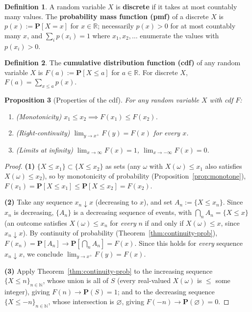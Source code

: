 \documentclass[11pt]{article}
\theoremstyle{definition}
\newtheorem{definition}{Definition}[section]
\theoremstyle{plain}
\newtheorem{proposition}[definition]{Proposition}
\theoremstyle{remark}
\newcommand{\R}{\mathbb{R}}
\newcommand{\N}{\mathbb{N}}
\begin{document}
\begin{definition}
A random variable $X$ is \textbf{discrete} if it takes at most countably many values.
The \textbf{probability mass function (pmf)} of a discrete $X$ is
$p(x) := \mathbf{P}[X=x]$ for $x \in \R$; necessarily $p(x)>0$ for at most countably many $x$, and
$\sum_{i} p(x_i) = 1$ where $x_1,x_2,\dots$ enumerate the values with $p(x_i)>0$.
\end{definition}

\begin{definition}
The \textbf{cumulative distribution function (cdf)} of any random variable $X$ is
$F(a) := \mathbf{P}[X\le a]$ for $a \in \R$. For discrete $X$, $F(a) = \sum_{x\le a}p(x)$.
\end{definition}

\begin{proposition}[Properties of the cdf]
\label{prop:cdf-properties}
For any random variable $X$ with cdf $F$:
\begin{enumerate}[label=(\arabic*)]
\item (Monotonicity) $x_1 \le x_2 \implies F(x_1)\le F(x_2)$.
\item (Right-continuity) $\lim_{y\to x^+}F(y) = F(x)$ for every $x$.
\item (Limits at infinity) $\lim_{x\to\infty}F(x)=1$, $\lim_{x\to-\infty}F(x)=0$.
\end{enumerate}
\end{proposition}
\begin{proof}
\textbf{(1)} $\{X\le x_1\}\subset \{X\le x_2\}$ as sets (any $\omega$ with $X(\omega)\le x_1$ also
satisfies $X(\omega)\le x_2$), so by monotonicity of probability (Proposition~\ref{prop:monotone}),
$F(x_1)=\mathbf{P}[X\le x_1]\le \mathbf{P}[X\le x_2]=F(x_2)$.

\textbf{(2)} Take any sequence $x_n \downarrow x$ (decreasing to $x$), and set $A_n := \{X\le x_n\}$.
Since $x_n$ is decreasing, $\{A_n\}$ is a decreasing sequence of events, with
$\bigcap_n A_n = \{X\le x\}$ (an outcome satisfies $X(\omega)\le x_n$ for \emph{every} $n$ if and
only if $X(\omega)\le x$, since $x_n \downarrow x$). By continuity of probability
(Theorem~\ref{thm:continuity-prob}), $F(x_n)=\mathbf{P}[A_n]\to \mathbf{P}[\bigcap_n A_n]=F(x)$.
Since this holds for \emph{every} sequence $x_n\downarrow x$, we conclude $\lim_{y\to x^+}F(y)=F(x)$.

\textbf{(3)} Apply Theorem~\ref{thm:continuity-prob} to the increasing sequence
$\{X\le n\}_{n\in\N}$, whose union is all of $S$ (every real-valued $X(\omega)$ is $\le$ some
integer), giving $F(n)\to \mathbf{P}(S)=1$; and to the decreasing sequence $\{X\le -n\}_{n\in\N}$,
whose intersection is $\varnothing$, giving $F(-n)\to \mathbf{P}(\varnothing)=0$.
\end{proof}
\end{document}
